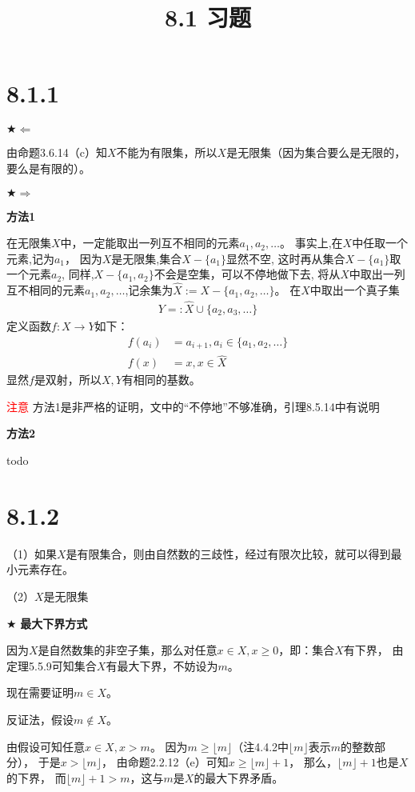 \documentclass{article}
\theoremstyle{mystyle}
\begin{document}
\title{8.1 习题}
\maketitle

\section*{8.1.1}

$\bigstar \Leftarrow$

由命题3.6.14（c）知$X$不能为有限集，所以$X$是无限集（因为集合要么是无限的，要么是有限的）。


$\bigstar \Rightarrow$

\textbf{方法1}

在无限集$X$中，一定能取出一列互不相同的元素$a_1,a_2,…$。
事实上,在$X$中任取一个元素,记为$a_1$，
因为$X$是无限集,集合$X-\{a_1\}$显然不空,
这时再从集合$X-\{a_1\}$取一个元素$a_2$,
同样,$X-\{a_1, a_2\}$不会是空集，可以不停地做下去,
将从$X$中取出一列互不相同的元素$a_1,a_2,…$,记余集为$\hat{X} := X-\{a_1,a_2,…\}$。
在$X$中取出一个真子集
\begin{align*}
  Y =: \hat{X} \cup \{a_2,a_3,…\}
\end{align*}
定义函数$f: X \rightarrow Y$如下：
\begin{align*}
  f(a_i) & = a_{i+1}, a_i \in \{a_1,a_2,…\} \\
  f(x)   & = x, x \in \hat{X}
\end{align*}
显然$f$是双射，所以$X,Y$有相同的基数。

\textcolor{red}{注意}
方法1是非严格的证明，文中的“不停地”不够准确，引理8.5.14中有说明

\textbf{方法2}

todo

\section*{8.1.2}
（1）如果$X$是有限集合，则由自然数的三歧性，经过有限次比较，就可以得到最小元素存在。

（2）$X$是无限集

$\bigstar$ \textbf{最大下界方式}

因为$X$是自然数集的非空子集，那么对任意$x \in X, x \geq 0$，即：集合$X$有下界，
由定理5.5.9可知集合$X$有最大下界，不妨设为$m$。

现在需要证明$m \in X$。

反证法，假设$m \not \in X$。

由假设可知任意$x \in X, x > m$。
因为$m \geq \lfloor m \rfloor$（注4.4.2中$\lfloor m \rfloor$表示$m$的整数部分），
于是$x > \lfloor m \rfloor$，
由命题2.2.12（e）可知$x \geq \lfloor m \rfloor + 1$，
那么，$\lfloor m \rfloor + 1$也是$X$的下界，
而$\lfloor m \rfloor + 1 > m$，这与$m$是$X$的最大下界矛盾。
\end{document}
